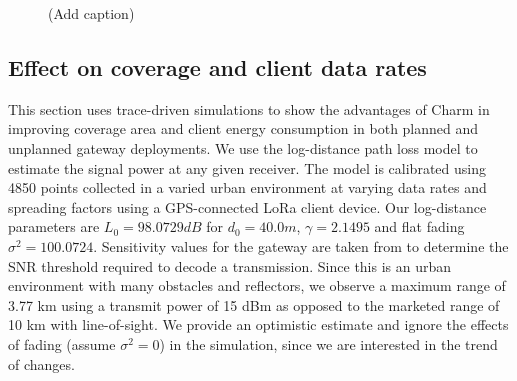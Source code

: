 \begin{figure}[htb]
\centering
{} \hfill
{} \hfill
{}
\compactimg
\caption{{\color{blue} (Add caption)}}
\label{fig:charm-improvement}
\compactimg
\end{figure}


\subsection{Effect on coverage and client data rates}
\label{sec:coverage-data-rate-improvement}

This section uses trace-driven simulations to show the advantages of Charm in improving coverage area and client energy consumption in both planned and unplanned gateway deployments. We use the log-distance path loss model to estimate the signal power at any given receiver. The model is calibrated using 4850 points collected in a varied urban environment at varying data rates and spreading factors using a GPS-connected LoRa client device. Our log-distance parameters are $L_0  = 98.0729 dB$ for $d_0 = 40.0 m$, $\gamma = 2.1495$ and flat fading $\sigma^2 = 100.0724$. Sensitivity values for the gateway are taken from \cite{Bor2016} to determine the SNR threshold required to decode a transmission. Since this is an urban environment with many obstacles and reflectors, we observe a maximum range of 3.77 km using a transmit power of 15 dBm as opposed to the marketed range of 10 km with line-of-sight. We provide an optimistic estimate and ignore the effects of fading (assume $\sigma^2 = 0$) in the simulation, since we are interested in the trend of changes.

